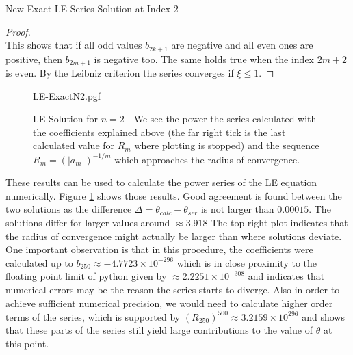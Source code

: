 \begin{appendix}
\begin{section}
\begin{subsection}{New Exact LE Series Solution at Index 2}
\begin{proof}
\begin{equation}
	\end{equation}
	This shows that if all odd values $b_{2k+1}$ are negative and all even ones are positive, 
	then $b_{2m+1}$ is negative too. The same holds true when the index $2m+2$ is even.
	By the Leibniz criterion the series converges if $\xi\leq1$. 
\end{proof}
\begin{figure}[H]
	{LE-ExactN2.pgf}
	\caption[LE Solution for $n=2$]{LE Solution for $n=2$ - We see the power 
	the series calculated with the coefficients explained above (the far right tick is the 
	last calculated value for $R_m$ where plotting is stopped) and 
	the sequence $R_m=(|a_m|)^{-1/m}$ which approaches the radius of convergence.
	}
	\label{5-MoExSo-LEN2-Plot}
\end{figure}\noindent
These results can be used to calculate the power series of the LE equation numerically. 
Figure \ref{5-MoExSo-LEN2-Plot} shows those results. Good agreement is found between the two solutions 
as the difference $\Delta=\theta_{calc}-\theta_{ser}$ is not larger than $0.00015$.
The solutions differ for larger values around $\approx3.918$
The top right plot indicates that the radius of convergence might actually be larger than 
where solutions deviate. 
One important observation is that in this procedure, 
the coefficients were calculated up to $b_{250}\approx-4.7723\times10^{-296}$ which is in close 
proximity to the floating point limit of python given by $\approx2.2251\times10^{-308}$ and 
indicates that numerical errors may be the reason the series starts to diverge. 
Also in order to achieve sufficient numerical precision, we would need to calculate higher 
order terms of the series, which is supported by $(R_{250})^{500}\approx3.2159\times10^{296}$ and shows
that these parts of the series still yield large contributions to the value of $\theta$ at this point.
\end{subsection}
\end{section}
\end{appendix}
